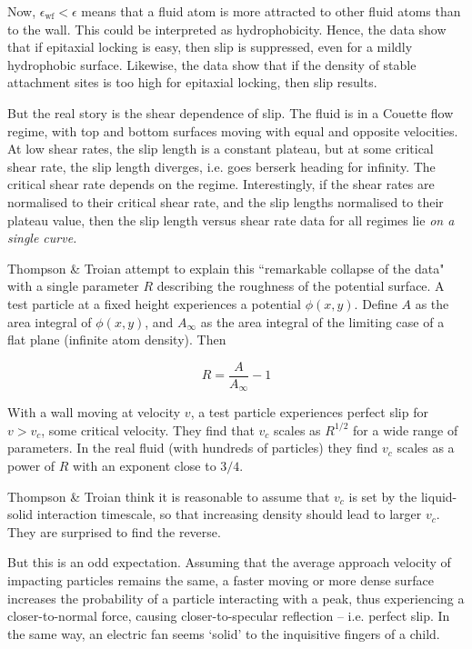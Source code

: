 \documentclass[12pt, a4paper, twoside, openright]{book}
\newcommand{\ewf}{\ensuremath{\epsilon_{\mathrm{wf}}}}
\begin{document}
Now, $\ewf < \epsilon$ means that a fluid atom is more attracted to other fluid atoms than to the wall.  This could be interpreted as hydrophobicity. Hence, the data show that if epitaxial locking is easy, then slip is suppressed, even for a mildly hydrophobic surface. Likewise, the data show that if the density of stable attachment sites is too high for epitaxial locking, then slip results.

But the real story is the shear dependence of slip. The fluid is in a Couette flow regime, with top and bottom surfaces moving with equal and opposite velocities.  At low shear rates, the slip length is a constant plateau, but at some critical shear rate, the slip length diverges, i.e. goes berserk heading for infinity. The critical shear rate depends on the regime.  Interestingly, if the shear rates are normalised to their critical shear rate, and the slip lengths normalised to their plateau value, then the slip length versus shear rate data for all regimes lie \emph{on a single curve.}

Thompson \& Troian attempt to explain this ``remarkable collapse of the data" with a single parameter $R$ describing the roughness of the potential surface. A test particle at a fixed height experiences a potential $\phi(x,y)$. Define $A$ as the area integral of $\phi(x,y)$, and $A_{\infty}$ as the area integral of the limiting case of a flat plane (infinite atom density). Then

\begin{equation}
R = \frac{A}{A_{\infty}} - 1
\end{equation}

With a wall moving at velocity $v$, a test particle experiences perfect slip for $v>v_{c}$, some critical velocity. They find that $v_{c}$ scales as $R^{1/2}$ for a wide range of parameters. In the real fluid (with hundreds of particles) they find $v_{c}$ scales as a power of $R$ with an exponent close to $3/4$.

Thompson \& Troian think it is reasonable to assume that $v_{c}$ is set by the liquid-solid interaction timescale, so that increasing density should lead to larger $v_{c}$.  They are surprised to find the reverse.

But this is an odd expectation. Assuming that the average approach velocity of impacting particles remains the same, a faster moving or more dense surface increases the probability of a particle interacting with a peak, thus experiencing a closer-to-normal force, causing closer-to-specular reflection -- i.e. perfect slip.  In the same way, an electric fan seems `solid' to the inquisitive fingers of a child.
\end{document}
